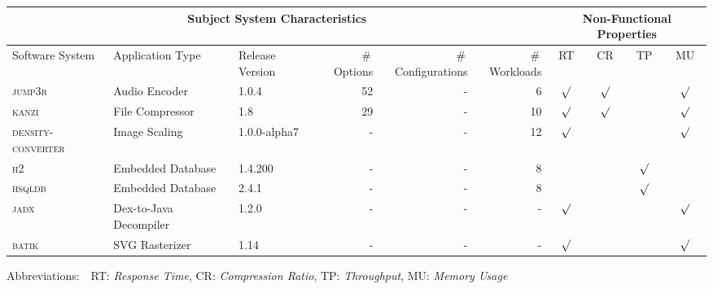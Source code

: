 \begin{tabular}{lllrrr|cccc}
		\toprule
		\multicolumn{6}{c}{\textbf{Subject System Characteristics}} & \multicolumn{4}{c}{\textbf{Non-Functional Properties}} \\
		\midrule
		Software System &  Application Type & Release Version & \#\,Options & \#\,Configurations & \#\,Workloads & RT & CR & TP & MU \\
		\midrule
		\rowcolor{ForestGreen!20}
		\textsc{jump3r} & Audio Encoder & 1.0.4 & 52 & - & 6 & $\surd$ & $\surd$ &  & $\surd$  \\
		
		\rowcolor{ForestGreen!20}	
		\textsc{kanzi} & File Compressor & 1.8 & 29 & - & 10 & $\surd$ & $\surd$ &  & $\surd$  \\
		
		\rowcolor{ForestGreen!20}	
		\textsc{density-converter} & Image Scaling & 1.0.0-alpha7 & - & - & 12 & $\surd$  &  &  & $\surd$  \\
				
		\rowcolor{LimeGreen!30}	
		\textsc{h2} & Embedded Database & 1.4.200 & - & -  & 8 &   &  & $\surd$ &  \\
		

		\rowcolor{LimeGreen!30}	
		\textsc{hsqldb} & Embedded Database & 2.4.1 & - & - & 8  &  &  & $\surd$ &  \\
		

		\rowcolor{SpringGreen!20}
		\textsc{jadx} & Dex-to-Java Decompiler & 1.2.0 & - & - & - & $\surd$ &  &  & $\surd$  \\
		
		\rowcolor{SpringGreen!20}
		\textsc{batik} & SVG Rasterizer & 1.14 & - & - &  - & $\surd$ &   &  & $\surd$  \\
		
		
		
		
		\bottomrule
	\end{tabular}
	
	{\vspace{2mm}
	{Abbreviations:$\quad$RT: \textit{Response Time}, CR: \textit{Compression Ratio}, TP: \textit{Throughput}, MU: \textit{Memory Usage}}}
	\vspace{0.1cm}
